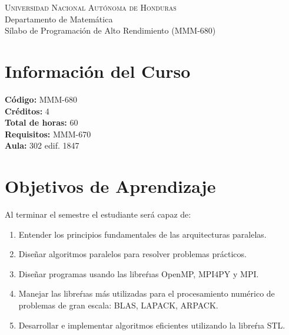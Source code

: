\documentclass[letterpaper]{article}
\begin{document}
\begin{center}
  \Large \textsc{Universidad Nacional Autónoma de Honduras}\\
  \large Departamento de Matemática\\
  Sílabo de Programación de Alto Rendimiento  (MMM-680) \\
\end{center}

\section*{Información del Curso} %
\textbf{Código:} MMM-680 \\
\textbf{Créditos:} 4 \\
\textbf{Total de horas:} 60 \\
\textbf{Requisitos:} MMM-670\\
\textbf{Aula:} 302 edif. 1847 

\section{Objetivos de Aprendizaje}
Al terminar el semestre el estudiante será capaz de: %
\begin{enumerate}
    \item Entender los principios fundamentales de las arquitecturas paralelas. %
    \item Diseñar algoritmos paralelos para resolver problemas prácticos. %
    \item Diseñar programas usando las libreŕıas OpenMP, MPI4PY y MPI. %
    \item Manejar las libreŕıas más utilizadas para el procesamiento numérico de problemas de gran escala: BLAS, LAPACK, ARPACK. %
    \item Desarrollar e implementar algoritmos eficientes utilizando la libreŕıa STL. %
\end{enumerate}
\end{document}

